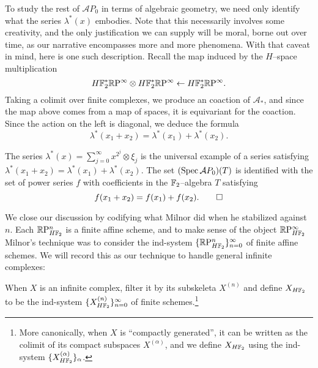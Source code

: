 
To study the rest of $\mathcal AP_0$ in terms of algebraic geometry, we need only identify what the series $\lambda^*(x)$ embodies.  Note that this necessarily involves some creativity, and the only justification we can supply will be moral, borne out over time, as our narrative encompasses more and more phenomena.  With that caveat in mind, here is one such description.  Recall the map induced by the $H$--space multiplication \[H\mathbb F_2^* \mathbb R\mathrm P^\infty \otimes H\mathbb F_2^* \mathbb R\mathrm P^\infty \leftarrow H\mathbb F_2^* \mathbb R\mathrm P^\infty.\]  Taking a colimit over finite complexes, we produce an coaction of $\mathcal A_*$, and since the map above comes from a map of spaces, it is equivariant for the coaction.  Since the action on the left is diagonal, we deduce the formula \[\lambda^*(x_1 + x_2) = \lambda^*(x_1) + \lambda^*(x_2).\]

\begin{lemma}\label{SteenrodAlgIdentifiedWithAutGa}
The series $\lambda^*(x) = \sum_{j=0}^\infty x^{2^j} \otimes \xi_j$ is the universal example of a series satisfying $\lambda^*(x_1 + x_2) = \lambda^*(x_1) + \lambda^*(x_2)$.  The set $(\operatorname{Spec} \mathcal AP_0)(T)$ is identified with the set of power series $f$ with coefficients in the $\mathbb F_2$--algebra $T$ satisfying \[f(x_1 + x_2) = f(x_1) + f(x_2). \qed\]
\end{lemma}

We close our discussion by codifying what Milnor did when he stabilized against $n$.  Each $\mathbb R\mathrm P^n_{H\mathbb F_2}$ is a finite affine scheme, and to make sense of the object $\mathbb R\mathrm P^\infty_{H\mathbb F_2}$ Milnor's technique was to consider the ind-system $\{\mathbb R\mathrm P^n_{H\mathbb F_2}\}_{n=0}^\infty$ of finite affine schemes.  We will record this as our technique to handle general infinite complexes:
\begin{definition}
When $X$ is an infinite complex, filter it by its subskeleta $X^{(n)}$ and define $X_{H\mathbb F_2}$ to be the ind-system $\{X^{(n)}_{H\mathbb F_2}\}_{n=0}^\infty$ of finite schemes.\footnote{More canonically, when $X$ is ``compactly generated'', it can be written as the colimit of its compact subspaces $X^{(\alpha)}$, and we define $X_{H\mathbb F_2}$ using the ind-system $\{X^{(\alpha)}_{H\mathbb F_2}\}_\alpha$.}
\end{definition}

